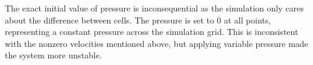 The exact initial value of pressure is inconsequential as the simulation only cares about the difference between cells.
The pressure is set to 0 at all points, representing a constant pressure across the simulation grid.
This is inconsistent with the nonzero velocities mentioned above, but applying variable pressure made the system more unstable.